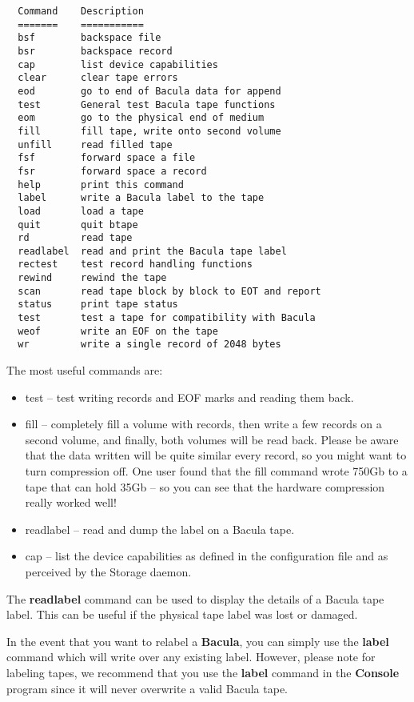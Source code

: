 \footnotesize
\begin{verbatim}
  Command    Description
  =======    ===========
  bsf        backspace file
  bsr        backspace record
  cap        list device capabilities
  clear      clear tape errors
  eod        go to end of Bacula data for append
  test       General test Bacula tape functions
  eom        go to the physical end of medium
  fill       fill tape, write onto second volume
  unfill     read filled tape
  fsf        forward space a file
  fsr        forward space a record
  help       print this command
  label      write a Bacula label to the tape
  load       load a tape
  quit       quit btape
  rd         read tape
  readlabel  read and print the Bacula tape label
  rectest    test record handling functions
  rewind     rewind the tape
  scan       read tape block by block to EOT and report
  status     print tape status
  test       test a tape for compatibility with Bacula
  weof       write an EOF on the tape
  wr         write a single record of 2048 bytes
\end{verbatim}
\normalsize

The most useful commands are: 

\begin{itemize}
\item test -- test writing records and EOF marks and  reading them back.  
\item fill -- completely fill a volume with records, then  write a few records
   on a second volume, and finally,  both volumes will be read back. Please be
   aware that  the data written will be quite similar every record, so  you might
want to turn compression off. One user found  that the fill command wrote
750Gb to a tape that can  hold 35Gb -- so you can see that the hardware
compression  really worked well! 
\item readlabel -- read and dump the label on a Bacula tape.  
\item cap -- list the device capabilities as defined in the  configuration
   file and as perceived by the Storage daemon. 
   \end{itemize}

The {\bf readlabel} command can be used to display the details of a Bacula
tape label. This can be useful if the physical tape label was lost or damaged.


In the event that you want to relabel a {\bf Bacula}, you can simply use the
{\bf label} command which will write over any existing label. However, please
note for labeling tapes, we recommend that you use the {\bf label} command in
the {\bf Console} program since it will never overwrite a valid Bacula tape. 

